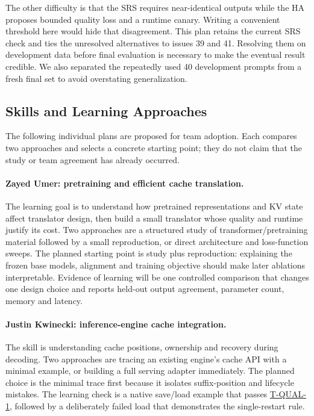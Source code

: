 \documentclass[12pt, titlepage]{article}
\newcommand{\tref}[1]{\hyperref[test:#1]{#1}}
\begin{document}
The other difficulty is that the SRS requires near-identical outputs while the HA proposes bounded quality loss and a runtime canary. Writing a convenient threshold here would hide that disagreement. This plan retains the current SRS check and ties the unresolved alternatives to issues 39 and 41. Resolving them on development data before final evaluation is necessary to make the eventual result credible. We also separated the repeatedly used 40 development prompts from a fresh final set to avoid overstating generalization.

\subsection{Skills and Learning Approaches}
The following individual plans are proposed for team adoption. Each compares two approaches and selects a concrete starting point; they do not claim that the study or team agreement has already occurred.

\paragraph{Zayed Umer: pretraining and efficient cache translation.}
The learning goal is to understand how pretrained representations and KV state affect translator design, then build a small translator whose quality and runtime justify its cost. Two approaches are a structured study of transformer/pretraining material followed by a small reproduction, or direct architecture and loss-function sweeps. The planned starting point is study plus reproduction: explaining the frozen base models, alignment and training objective should make later ablations interpretable. Evidence of learning will be one controlled comparison that changes one design choice and reports held-out output agreement, parameter count, memory and latency.

\paragraph{Justin Kwinecki: inference-engine cache integration.}
The skill is understanding cache positions, ownership and recovery during decoding. Two approaches are tracing an existing engine's cache API with a minimal example, or building a full serving adapter immediately. The planned choice is the minimal trace first because it isolates suffix-position and lifecycle mistakes. The learning check is a native save/load example that passes \tref{T-QUAL-1}, followed by a deliberately failed load that demonstrates the single-restart rule.
\end{document}
